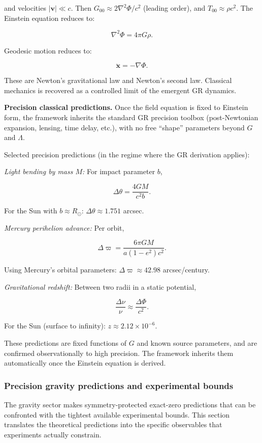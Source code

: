 \documentclass[11pt,a4paper]{article}
\theoremstyle{remark}
\begin{document}
and velocities \(|\mathbf{v}| \ll c\). Then \(G_{00} \approx 2\nabla^2\Phi/c^2\)
(leading order), and \(T_{00} \approx \rho c^2\). The Einstein equation reduces to:

\[
\nabla^2 \Phi = 4\pi G \rho.
\]

Geodesic motion reduces to:

\[
\ddot{\mathbf{x}} = -\nabla \Phi.
\]

These are Newton's gravitational law and Newton's second law. Classical
mechanics is recovered as a controlled limit of the emergent GR dynamics.

\textbf{Precision classical predictions.} Once the field equation is fixed to
Einstein form, the framework inherits the standard GR precision toolbox
(post-Newtonian expansion, lensing, time delay, etc.), with no free ``shape''
parameters beyond \(G\) and \(\Lambda\).

Selected precision predictions (in the regime where the GR derivation applies):

\emph{Light bending by mass \(M\):} For impact parameter \(b\),

\[
\Delta\theta = \frac{4GM}{c^2 b}.
\]

For the Sun with \(b \approx R_\odot\): \(\Delta\theta \approx 1.751\) arcsec.

\emph{Mercury perihelion advance:} Per orbit,

\[
\Delta\varpi = \frac{6\pi GM}{a(1-e^2)c^2}.
\]

Using Mercury's orbital parameters: \(\Delta\varpi \approx 42.98\) arcsec/century.

\emph{Gravitational redshift:} Between two radii in a static potential,

\[
\frac{\Delta\nu}{\nu} \approx \frac{\Delta\Phi}{c^2}.
\]

For the Sun (surface to infinity): \(z \approx 2.12 \times 10^{-6}\).

These predictions are fixed functions of \(G\) and known source parameters, and
are confirmed observationally to high precision. The framework inherits them
automatically once the Einstein equation is derived.

\subsubsection{Precision gravity predictions and experimental bounds}\label{precision-gravity-predictions-and-experimental-bounds}

The gravity sector makes symmetry-protected exact-zero predictions that can be
confronted with the tightest available experimental bounds. This section
translates the theoretical predictions into the specific observables that
experiments actually constrain.
\end{document}
